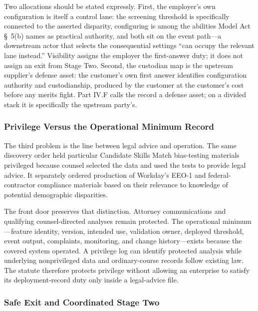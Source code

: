 Two allocations should be stated expressly. First, the employer's own configuration is itself a control lane: the screening threshold is specifically connected to the asserted disparity, configuring is among the abilities Model Act \S~5(b) names as practical authority, and both sit on the event path---a downstream actor that selects the consequential settings ``can occupy the relevant lane instead.'' Visibility assigns the employer the first-answer duty; it does not assign an exit from Stage Two. Second, the custodian map is the upstream supplier's defense asset: the customer's own first answer identifies configuration authority and custodianship, produced by the customer at the customer's cost before any merits fight. Part IV.F calls the record a defense asset; on a divided stack it is specifically the upstream party's.

\subsubsection{Privilege Versus the Operational Minimum Record}
\label{sec:mobley-privilege}

The third problem is the line between legal advice and operation. The same discovery order held particular Candidate Skills Match bias-testing materials privileged because counsel selected the data and used the tests to provide legal advice. It separately ordered production of Workday's EEO-1 and federal-contractor compliance materials based on their relevance to knowledge of potential demographic disparities.

The front door preserves that distinction. Attorney communications and qualifying counsel-directed analyses remain protected. The operational minimum---feature identity, version, intended use, validation owner, deployed threshold, event output, complaints, monitoring, and change history---exists because the covered system operated. A privilege log can identify protected analysis while underlying nonprivileged data and ordinary-course records follow existing law. The statute therefore protects privilege without allowing an enterprise to satisfy its deployment-record duty only inside a legal-advice file.

\subsubsection{Safe Exit and Coordinated Stage Two}

